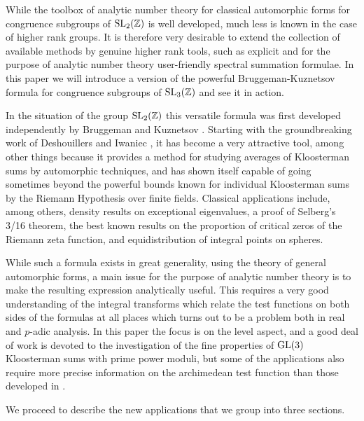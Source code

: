 \documentclass[11pt]{amsart}
\theoremstyle{plain}
\numberwithin{equation}{section}
\theoremstyle{definition}
\begin{document}
While the toolbox of analytic number theory for classical automorphic forms for congruence subgroups of ${\rm SL}_2(\Bbb{Z})$ is well developed, much less is known in the case of higher rank groups. It is therefore very desirable to extend the collection of available methods by genuine higher rank tools, such as explicit and  for the purpose of analytic number  theory user-friendly spectral summation formulae. In this paper we will introduce a version of the powerful Bruggeman-Kuznetsov formula for congruence subgroups of ${\rm SL}_3(\Bbb{Z})$ and see it in action.  

In the situation of the group ${\rm SL}_2(\Bbb{Z})$ this versatile formula  was first developed independently by Bruggeman \cite{Br} and Kuznetsov \cite{Ku}. Starting with the groundbreaking work of Deshouillers and Iwaniec \cite{DI}, it has become a  very attractive tool, among other things  because it provides a method for studying averages of Kloosterman sums by automorphic techniques, and has shown itself capable of going sometimes beyond the powerful bounds known for individual Kloosterman sums by the Riemann Hypothesis over finite fields. Classical applications include, among others, density results on exceptional eigenvalues, a proof of Selberg's 3/16 theorem, the best known results on the proportion of critical zeros of the Riemann zeta function, and equidistribution of integral points on spheres.

While such a formula exists in great generality, using the theory of general automorphic forms, a main issue for the purpose of analytic number theory is to make the resulting expression analytically useful. This requires a very good understanding of the integral transforms which relate the test functions on both sides of the formulas at all places which turns out to be a problem both in real and $p$-adic analysis. In this paper the focus is on the level aspect, and a good deal of work is devoted to the investigation of the fine properties of ${\rm GL}(3)$ Kloosterman sums with  prime power moduli, but some of the applications also require more precise information on the archimedean test function than those developed  in \cite{Bl}. 

We proceed to describe the new applications that we group into three sections.
\end{document}
